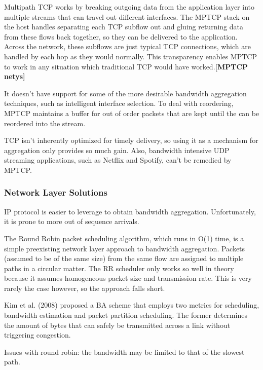 \documentclass[12pt]{article}
\newcommand{\lcite}[1]
{{\bfseries\color{orange}[#1]}}
\begin{document}
		Multipath TCP works by breaking outgoing data from the application layer into multiple streams that can travel out different interfaces. The MPTCP stack on the host handles separating each TCP subflow out and gluing returning data from these flows back together, so they can be delivered to the application. Across the network, these subflows are just typical TCP connections, which are handled by each hop as they would normally. This transparency enables MPTCP to work in any situation which traditional TCP would have worked.\lcite{MPTCP netys}

		It doesn't have support for some of the more desirable bandwidth aggregation techniques, such as intelligent interface selection. To deal with reordering, MPTCP maintains a buffer for out of order packets that are kept until the can be reordered into the stream. 

		TCP isn't inherently optimized for timely delivery, so using it as a mechanism for aggregation only provides so much gain. Also, bandwidth intensive UDP streaming applications, such as Netflix and Spotify, can't be remedied by MPTCP.

	\subsubsection{Network Layer Solutions}

		IP protocol is easier to leverage to obtain bandwidth aggregation. Unfortunately, it is prone to more out of sequence arrivals.

		The Round Robin packet scheduling algorithm, which runs in O(1) time, is a simple preexisting network layer approach to bandwidth aggregation. Packets (assumed to be of the same size) from the same flow are assigned to multiple paths in a circular matter. The RR scheduler only works so well in theory because it assumes homogeneous packet size and transmission rate. This is very rarely the case however, so the approach falls short.

		Kim et al. (2008) proposed a BA scheme that employs two metrics for scheduling, bandwidth estimation and packet partition scheduling. The former determines the amount of bytes that can safely be transmitted across a link without triggering congestion. 

		Issues with round robin: the bandwidth may be limited to that of the slowest path.
\end{document}
